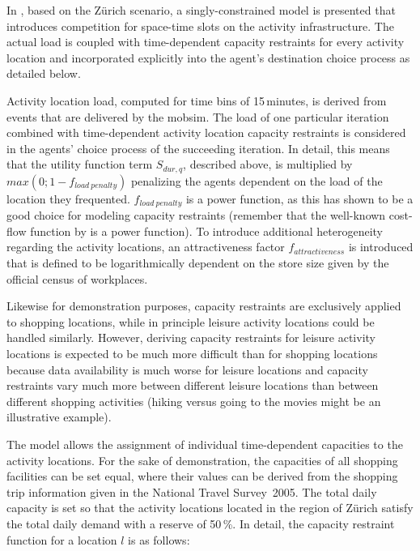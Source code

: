 In \citet[][]{HorniEtAl_TRR_2009}, based on the Zürich scenario, a singly-constrained model is presented that introduces competition for space-time slots on the activity infrastructure. 
The actual load is coupled with time-dependent capacity restraints for every activity location and incorporated explicitly into the agent's destination choice process as detailed below. 

Activity location load, computed for time bins of 15\,minutes, is derived from events that are delivered by the \gls{mobsim}. 
The load of one particular iteration combined with time-dependent activity location capacity restraints is considered in the agents' choice process of the succeeding iteration. 
In detail, this means that the utility function term $S_{dur,q}$, described above, is multiplied by $max(0; 1 - f_{load\ penalty})$ penalizing the agents dependent on the load of the location they frequented. 
$f_{load\ penalty}$ is a power function, as this has shown to be a good choice for modeling capacity restraints (remember that the well-known cost-flow function by \citet[][]{TA_manual_1964} is a power function). 
To introduce additional heterogeneity regarding the activity locations, an attractiveness factor $f_{attractiveness}$ is introduced that is defined to be logarithmically dependent on the store size given by the official census of workplaces.

Likewise for demonstration purposes, capacity restraints are exclusively applied to shopping locations, while in principle leisure activity locations could be handled similarly. However, deriving capacity restraints for leisure activity locations is expected to be much more difficult than for shopping locations because data availability is much worse for leisure locations and capacity restraints vary much more between different leisure locations than between different shopping activities (hiking versus going to the movies might be an illustrative example).

The model allows the assignment of individual time-dependent capacities to the activity locations. For the sake of demonstration, the capacities of all shopping facilities can be set equal, where their values can be derived from the shopping trip information given in the National Travel Survey~2005. The total daily capacity is set so that the activity locations located in the region of Zürich satisfy the total daily demand with a reserve of 50\,\%. In detail, the capacity restraint function for a location $l$ is as follows:

